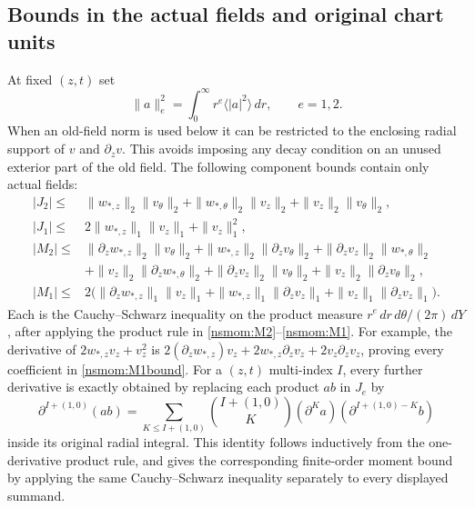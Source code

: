 \subsection{Bounds in the actual fields and original chart units}
\label{nsmom:bounds}
At fixed $(z,t)$ set
\[
 \|a\|_e^2=\int_0^\infty r^e\langle|a|^2\rangle\,dr,
 \qquad e=1,2.
\]
When an old-field norm is used below it can be restricted to the
enclosing radial support of $v$ and $\partial_zv$. This avoids imposing
any decay condition on an unused exterior part of the old field.
The following component bounds contain only actual fields:
\begin{align}
 |J_2|\le{}&\|w_{*,z}\|_2\|v_\theta\|_2
 +\|w_{*,\theta}\|_2\|v_z\|_2+\|v_z\|_2\|v_\theta\|_2,
 \label{nsmom:J2bound}\\
 |J_1|\le{}&2\|w_{*,z}\|_1\|v_z\|_1+\|v_z\|_1^2,
 \label{nsmom:J1bound}\\
 |M_2|\le{}&\|\partial_z w_{*,z}\|_2\|v_\theta\|_2
 +\|w_{*,z}\|_2\|\partial_zv_\theta\|_2
 +\|\partial_zv_z\|_2\|w_{*,\theta}\|_2\nonumber\\
 &+\|v_z\|_2\|\partial_z w_{*,\theta}\|_2
 +\|\partial_zv_z\|_2\|v_\theta\|_2
 +\|v_z\|_2\|\partial_zv_\theta\|_2,
 \label{nsmom:M2bound}\\
 |M_1|\le{}&2\bigl(\|\partial_z w_{*,z}\|_1\|v_z\|_1
 +\|w_{*,z}\|_1\|\partial_zv_z\|_1
 +\|v_z\|_1\|\partial_zv_z\|_1\bigr).
 \label{nsmom:M1bound}
\end{align}
Each is the Cauchy--Schwarz inequality on the product measure
$r^e\,dr\,d\theta/(2\pi)\,dY$, after applying the product rule in
\eqref{nsmom:M2}--\eqref{nsmom:M1}. For example, the derivative of
$2w_{*,z}v_z+v_z^2$ is
$2(\partial_z w_{*,z})v_z+2w_{*,z}\partial_zv_z+
2v_z\partial_zv_z$, proving every coefficient in
\eqref{nsmom:M1bound}.
For a $(z,t)$ multi-index $I$, every further derivative is exactly
obtained by replacing each product $ab$ in $J_e$ by
\[
 \partial^{I+(1,0)}(ab)
 =\sum_{K\le I+(1,0)}\binom{I+(1,0)}{K}
       (\partial^Ka)(\partial^{I+(1,0)-K}b)
\]
inside its original radial integral. This identity follows inductively
from the one-derivative product rule, and gives the corresponding
finite-order moment bound by applying the same Cauchy--Schwarz
inequality separately to every displayed summand.

